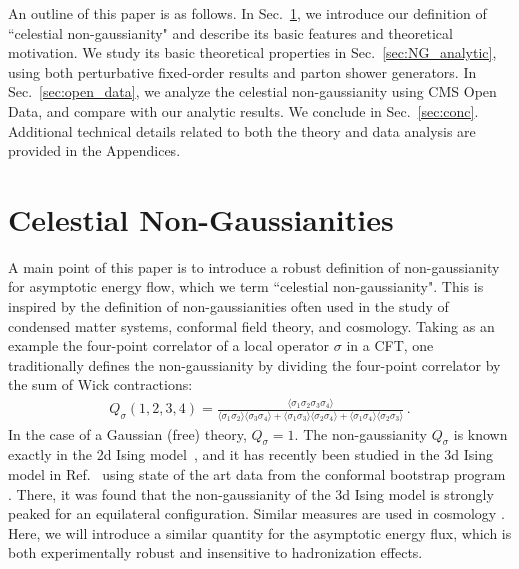 \documentclass[letterpaper,11pt]{article}
\DeclareRobustCommand{\Sec}[1]{Sec.~\ref{#1}}
\DeclareRobustCommand{\Ref}[1]{Ref.~\cite{#1}}
\begin{document}
An outline of this paper is as follows.
%
In \Sec{sec:NG}, we introduce our definition of ``celestial non-gaussianity" and describe its basic features and theoretical motivation.
%
We study its basic theoretical properties in \Sec{sec:NG_analytic}, using both perturbative fixed-order results and parton shower generators.
%
In \Sec{sec:open_data}, we analyze the celestial non-gaussianity using CMS Open Data, and compare with our analytic results.
%
We conclude in \Sec{sec:conc}.
%
Additional technical details related to both the theory and data analysis are provided in the Appendices.





\section{Celestial Non-Gaussianities}\label{sec:NG}

A main point of this paper is to introduce a robust definition of non-gaussianity for asymptotic energy flow, which we term ``celestial non-gaussianity".
%
This is inspired by the definition of non-gaussianities often used in the study of condensed matter systems, conformal field theory, and cosmology.
%
Taking as an example the four-point correlator of a local operator $\sigma$ in a CFT, one traditionally defines the non-gaussianity by dividing the four-point correlator by the sum of Wick contractions:
% 
\begin{align} \label{eq:Ising_NG_def}
Q_\sigma(1,2,3,4)=\frac{\langle  \sigma_1 \sigma_2  \sigma_3 \sigma_4  \rangle}{\langle \sigma_1 \sigma_2 \rangle \langle \sigma_3 \sigma_4 \rangle   +   \langle \sigma_1 \sigma_3 \rangle \langle \sigma_2 \sigma_4 \rangle   +   \langle \sigma_1 \sigma_4 \rangle \langle \sigma_2 \sigma_3 \rangle}\,.
\end{align}
%
In the case of a Gaussian (free) theory, $Q_\sigma=1$.
%
The non-gaussianity $Q_\sigma$ is known exactly in the 2d Ising model~\cite{Belavin:1984vu}, and it has recently been studied in the 3d Ising model in \Ref{Rychkov:2016mrc} using state of the art data \cite{Kos:2016ysd,Komargodski:2016auf,Simmons-Duffin:2016wlq} from the conformal bootstrap program \cite{Rattazzi:2008pe,El-Showk:2012cjh,El-Showk:2014dwa,Poland:2018epd}.
%
There, it was found that the non-gaussianity of the 3d Ising model is strongly peaked for an equilateral configuration.
%
Similar measures are used in cosmology \cite{Baumann:2009ds}.
%
Here, we will introduce a similar quantity for the asymptotic energy flux, which is both experimentally robust and insensitive to hadronization effects.
\end{document}
